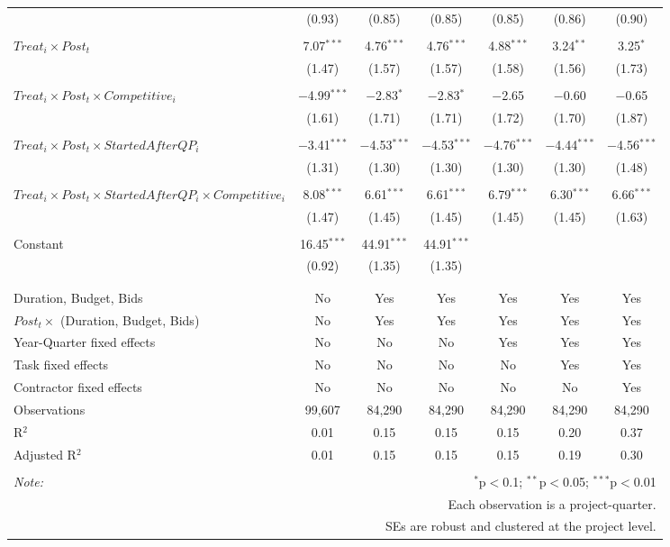 \documentclass[
]{article}
\begin{document}
\begin{table}[H]
\begin{tabular}{@{\extracolsep{-3pt}}lcccccc}
  & (0.93) & (0.85) & (0.85) & (0.85) & (0.86) & (0.90) \\ 
  & & & & & & \\ 
 $Treat_i \times Post_t$ & 7.07$^{***}$ & 4.76$^{***}$ & 4.76$^{***}$ & 4.88$^{***}$ & 3.24$^{**}$ & 3.25$^{*}$ \\ 
  & (1.47) & (1.57) & (1.57) & (1.58) & (1.56) & (1.73) \\ 
  & & & & & & \\ 
 $Treat_i \times Post_t \times Competitive_i$ & $-$4.99$^{***}$ & $-$2.83$^{*}$ & $-$2.83$^{*}$ & $-$2.65 & $-$0.60 & $-$0.65 \\ 
  & (1.61) & (1.71) & (1.71) & (1.72) & (1.70) & (1.87) \\ 
  & & & & & & \\ 
 $Treat_i \times Post_t \times StartedAfterQP_i$ & $-$3.41$^{***}$ & $-$4.53$^{***}$ & $-$4.53$^{***}$ & $-$4.76$^{***}$ & $-$4.44$^{***}$ & $-$4.56$^{***}$ \\ 
  & (1.31) & (1.30) & (1.30) & (1.30) & (1.30) & (1.48) \\ 
  & & & & & & \\ 
 $Treat_i \times Post_t \times StartedAfterQP_i \times Competitive_i$ & 8.08$^{***}$ & 6.61$^{***}$ & 6.61$^{***}$ & 6.79$^{***}$ & 6.30$^{***}$ & 6.66$^{***}$ \\ 
  & (1.47) & (1.45) & (1.45) & (1.45) & (1.45) & (1.63) \\ 
  & & & & & & \\ 
 Constant & 16.45$^{***}$ & 44.91$^{***}$ & 44.91$^{***}$ &  &  &  \\ 
  & (0.92) & (1.35) & (1.35) &  &  &  \\ 
  & & & & & & \\ 
\hline \\[-1.8ex] 
Duration, Budget, Bids & No & Yes & Yes & Yes & Yes & Yes \\ 
$Post_t \times $  (Duration, Budget, Bids) & No & Yes & Yes & Yes & Yes & Yes \\ 
Year-Quarter fixed effects & No & No & No & Yes & Yes & Yes \\ 
Task fixed effects & No & No & No & No & Yes & Yes \\ 
Contractor fixed effects & No & No & No & No & No & Yes \\ 
Observations & 99,607 & 84,290 & 84,290 & 84,290 & 84,290 & 84,290 \\ 
R$^{2}$ & 0.01 & 0.15 & 0.15 & 0.15 & 0.20 & 0.37 \\ 
Adjusted R$^{2}$ & 0.01 & 0.15 & 0.15 & 0.15 & 0.19 & 0.30 \\ 
\hline 
\hline \\[-1.8ex] 
\textit{Note:}  & \multicolumn{6}{r}{$^{*}$p$<$0.1; $^{**}$p$<$0.05; $^{***}$p$<$0.01} \\ 
 & \multicolumn{6}{r}{Each observation is a project-quarter.} \\ 
 & \multicolumn{6}{r}{SEs are robust and clustered at the project level.} \\ 
\end{tabular} 
\end{table}
\end{document}
